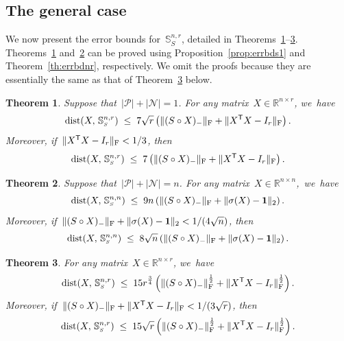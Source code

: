 \documentclass[11pt,a4paper]{article}  %
\newtheorem{theorem}{Theorem}%
\theoremstyle{definition}
\DeclareMathOperator{\dist}{dist}
\newcommand{\RR}{\mathbb{R}}
\newcommand{\col}{r}
\newcommand{\stf}[1]{\mathbb{S}^{#1}}
\newcommand{\fro}{{\scriptstyle{\textnormal{F}}}}
\newcommand{\trs}{{\scriptstyle{\mathsf{T}}}}
\newcommand{\signmat}{S}
\newcommand{\tsign}{{\scriptscriptstyle{S}}}
\newcommand{\posset}{\mathcal{P}}
\newcommand{\negset}{\mathcal{N}}
\newcommand{\ones}{\mathbf{1}}
\newcommand{\hp}{\circ}
\begin{document}
\subsection{The general case}

We now present the error bounds for~$\stf{n,\col}_\tsign$, detailed in
Theorems~\ref{th:errbdsgen1}--\ref{th:errbdsgen}.
Theorems~\ref{th:errbdsgen1} and~\ref{th:errbdsgenn} can be proved using Proposition~\ref{prop:errbds1}
and Theorem~\ref{th:errbdnr}, respectively. We omit the proofs because they are essentially the same as
that of Theorem~\ref{th:errbdsgen} below.
\begin{theorem}\label{th:errbdsgen1}
    Suppose that~$|\posset| + |\negset| = 1$. For any matrix~$X\in \RR^{n\times \col}$, we~have
    \begin{equation}
        \nonumber
        \dist(X,\, \stf{n,\col}_{\tsign}) \;\le\;
        7\sqrt{\col} \left(\|(\signmat \hp X)_{-}\|_\fro+ \|X^\trs  X - I_\col\|_\fro \right).
    \end{equation}
    Moreover, if~$\|X^\trs X -I_\col\|_\fro < 1/3$, then
    \begin{equation}
        \nonumber
        \dist(X,\, \stf{n,\col}_{\tsign}) \;\le\;
        7 \left( \|(\signmat\hp X)_{-}\|_\fro + \|X^\trs  X - I_\col\|_\fro \right).
    \end{equation}
\end{theorem}

\begin{theorem}
    \label{th:errbdsgenn}
    Suppose that~$|\posset| + |\negset| =n$. For any matrix~$X\!\in\RR^{n\times n}$,~we~have%
        \begin{equation}
            \nonumber
            \dist(X,\,\stf{n,n}_\tsign) \;\le\; 9n\left( \|(\signmat \hp X)_{-}\|_\fro + \|\sigma(X) -\ones\|_2 \right).
        \end{equation}
        Moreover, if~$\|(\signmat \hp X)_{-}\|_\fro + \|\sigma(X) -\ones\|_2 < 1/(4\sqrt{n})$, then
        \begin{equation}
            \nonumber
            \dist(X,\,\stf{n,n}_\tsign) \;\le\; 8\sqrt{n}\left( \|(\signmat \hp X)_{-}\|_\fro + \|\sigma(X) -\ones\|_2 \right).
        \end{equation}
\end{theorem}


\begin{theorem}\label{th:errbdsgen}
    For any matrix~$X\in \RR^{n\times \col}$, we~have
    \begin{equation}
        \label{eq:gerrbdsgen}
        \dist(X,\, \stf{n,\col}_{\tsign}) \;\le\;
        15\col^{\frac{3}{4}} \left(\|(\signmat \hp X)_{-}\|_\fro^{\frac{1}{2}} + \|X^\trs  X - I_\col\|_\fro^{\frac{1}{2}} \right).
    \end{equation}
    Moreover, if~$\|(\signmat\hp X)_{-}\|_\fro + \|X^\trs X -I_\col\|_\fro < 1/(3\sqrt{\col})$, then
    \begin{equation}
        \label{eq:lerrbdsgen}
        \dist(X,\, \stf{n,\col}_{\tsign}) \;\le\;
        15\sqrt{\col} \left( \|(\signmat\hp X)_{-}\|_\fro^{\frac{1}{2}} + \|X^\trs  X - I_\col\|_\fro ^{\frac{1}{2}} \right).
    \end{equation}
\end{theorem}
\end{document}
